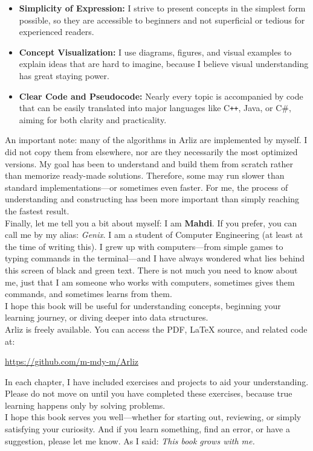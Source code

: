 \begin{itemize}
	\item \textbf{Simplicity of Expression:} I strive to present concepts in the simplest form possible, so they are accessible to beginners and not superficial or tedious for experienced readers.
	\item \textbf{Concept Visualization:} I use diagrams, figures, and visual examples to explain ideas that are hard to imagine, because I believe visual understanding has great staying power.
	\item \textbf{Clear Code and Pseudocode:} Nearly every topic is accompanied by code that can be easily translated into major languages like C\texttt{++}, Java, or C\#, aiming for both clarity and practicality.
\end{itemize}
An important note: many of the algorithms in Arliz are implemented by myself. I did not copy them from elsewhere, nor are they necessarily the most optimized versions. My goal has been to understand and build them from scratch rather than memorize ready-made solutions. Therefore, some may run slower than standard implementations—or sometimes even faster. For me, the process of understanding and constructing has been more important than simply reaching the fastest result.\\	
Finally, let me tell you a bit about myself:  
I am \textbf{Mahdi}. If you prefer, you can call me by my alias: \emph{Genix}. I am a student of Computer Engineering (at least at the time of writing this). I grew up with computers—from simple games to typing commands in the terminal—and I have always wondered what lies behind this screen of black and green text. There is not much you need to know about me, just that I am someone who works with computers, sometimes gives them commands, and sometimes learns from them.\\	
I hope this book will be useful for understanding concepts, beginning your learning journey, or diving deeper into data structures. \\	
Arliz is freely available. You can access the PDF, LaTeX source, and related code at:  
\begin{center}
	\url{https://github.com/m-mdy-m/Arliz}
\end{center}
In each chapter, I have included exercises and projects to aid your understanding. Please do not move on until you have completed these exercises, because true learning happens only by solving problems.\\	
I hope this book serves you well—whether for starting out, reviewing, or simply satisfying your curiosity. And if you learn something, find an error, or have a suggestion, please let me know. As I said:
\emph{This book grows with me.}